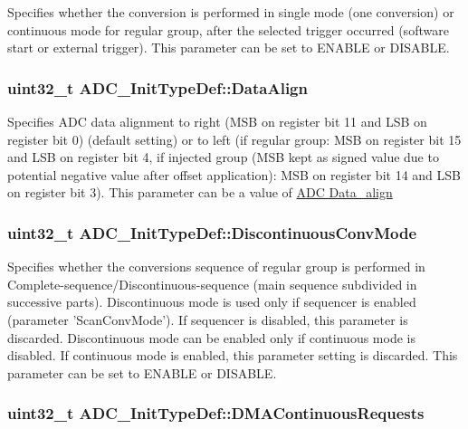 Specifies whether the conversion is performed in single mode (one conversion) or continuous mode for regular group, after the selected trigger occurred (software start or external trigger). This parameter can be set to E\-N\-A\-B\-L\-E or D\-I\-S\-A\-B\-L\-E. \hypertarget{struct_a_d_c___init_type_def_af9ec9040d55aa68c23d92d174b464ac1}{
\subsubsection[{Data\-Align}]{\setlength{\rightskip}{0pt plus 5cm}uint32\-\_\-t A\-D\-C\-\_\-\-Init\-Type\-Def\-::\-Data\-Align}}\label{struct_a_d_c___init_type_def_af9ec9040d55aa68c23d92d174b464ac1}
Specifies A\-D\-C data alignment to right (M\-S\-B on register bit 11 and L\-S\-B on register bit 0) (default setting) or to left (if regular group\-: M\-S\-B on register bit 15 and L\-S\-B on register bit 4, if injected group (M\-S\-B kept as signed value due to potential negative value after offset application)\-: M\-S\-B on register bit 14 and L\-S\-B on register bit 3). This parameter can be a value of \hyperlink{group___a_d_c___data__align}{A\-D\-C Data\-\_\-align} \hypertarget{struct_a_d_c___init_type_def_a35cc74067e2d269bb2f5e8d71c245b4b}{
\subsubsection[{Discontinuous\-Conv\-Mode}]{\setlength{\rightskip}{0pt plus 5cm}uint32\-\_\-t A\-D\-C\-\_\-\-Init\-Type\-Def\-::\-Discontinuous\-Conv\-Mode}}\label{struct_a_d_c___init_type_def_a35cc74067e2d269bb2f5e8d71c245b4b}
Specifies whether the conversions sequence of regular group is performed in Complete-\/sequence/\-Discontinuous-\/sequence (main sequence subdivided in successive parts). Discontinuous mode is used only if sequencer is enabled (parameter 'Scan\-Conv\-Mode'). If sequencer is disabled, this parameter is discarded. Discontinuous mode can be enabled only if continuous mode is disabled. If continuous mode is enabled, this parameter setting is discarded. This parameter can be set to E\-N\-A\-B\-L\-E or D\-I\-S\-A\-B\-L\-E. \hypertarget{struct_a_d_c___init_type_def_afa360066652d6e8a2a3f56426b756fab}{
\subsubsection[{D\-M\-A\-Continuous\-Requests}]{\setlength{\rightskip}{0pt plus 5cm}uint32\-\_\-t A\-D\-C\-\_\-\-Init\-Type\-Def\-::\-D\-M\-A\-Continuous\-Requests}}\label{struct_a_d_c___init_type_def_afa360066652d6e8a2a3f56426b756fab}
